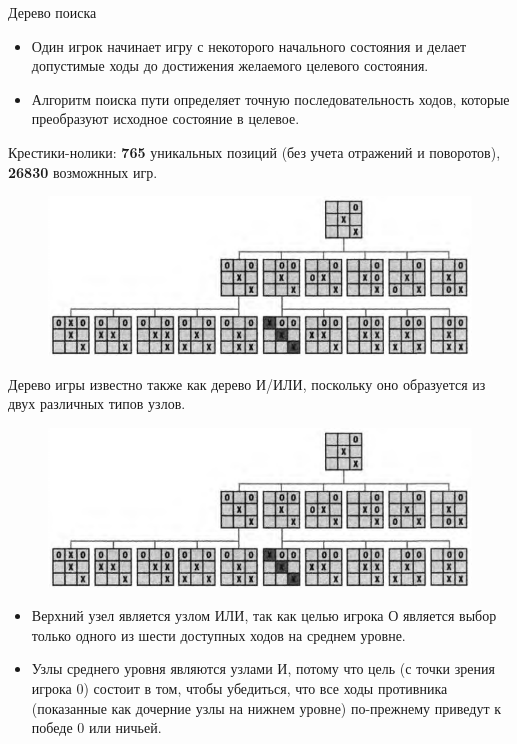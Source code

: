 \documentclass{beamer}
\begin{document}
\begin{frame}
\begin{block}{Дерево поиска}
\begin{itemize}
\item Один игрок начинает игру с некоторого начального состояния и делает допустимые ходы до достижения желаемого целевого состояния. 
\item Алгоритм поиска пути определяет точную последовательность ходов, которые преобразуют исходное состояние в целевое.
\end{itemize}
\end{block}
Крестики-нолики: \textbf{765} уникальных позиций (без учета отражений и поворотов), \textbf{26830} возможнных игр.
\begin{figure}[h]
\centering
\includegraphics[scale=0.5]{images/lec05-pic01.png}
\end{figure}
\end{frame}

\begin{frame}
Дерево игры известно также как дерево И/ИЛИ, поскольку оно образуется из
двух различных типов узлов.
\begin{figure}[h]
\centering
\includegraphics[scale=0.5]{images/lec05-pic01.png}
\end{figure}
\begin{itemize}
\item Верхний узел является узлом ИЛИ, так как целью игрока О является выбор только одного из шести доступных ходов на среднем уровне.
\item Узлы среднего уровня являются узлами И, потому что цель (с точки зрения игрока 0)
состоит в том, чтобы убедиться, что все ходы противника (показанные как дочерние
узлы на нижнем уровне) по-прежнему приведут к победе 0 или ничьей. 
\end{itemize}
\end{frame}
\end{document}

